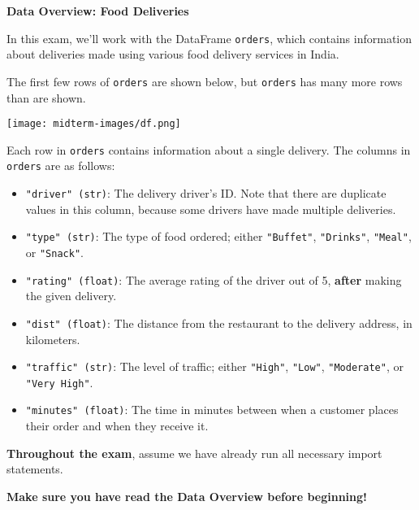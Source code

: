 \begin{center}
    \noindent \textbf{\large{Data Overview: Food Deliveries}} 
\end{center}

\noindent In this exam, we'll work with the DataFrame \texttt{orders}, which contains information about deliveries made using various food delivery services in India.

\vspace{.1in}

\noindent The first few rows of \texttt{orders} are shown below, but \texttt{orders} has many more rows than are shown.


\begin{center}

\texttt{[image: midterm-images/df.png]}

\end{center}

\vspace{.1in}

\noindent Each row in \texttt{orders} contains information about a single delivery. The columns in \texttt{orders} are as follows:

\begin{itemize}

\item \texttt{"driver" (str)}: The delivery driver's ID. Note that there are duplicate values in this column, because some drivers have made multiple deliveries.
\item \texttt{"type" (str)}: The type of food ordered; either \texttt{"Buffet"}, \texttt{"Drinks"}, \texttt{"Meal"}, or \texttt{"Snack"}.
\item \texttt{"rating" (float)}: The average rating of the driver out of 5, \textbf{after} making the given delivery.
\item \texttt{"dist" (float)}: The distance from the restaurant to the delivery address, in kilometers.
\item \texttt{"traffic" (str)}: The level of traffic; either \texttt{"High"}, \texttt{"Low"}, \texttt{"Moderate"}, or \texttt{"Very High"}.
\item \texttt{"minutes" (float)}: The time in minutes between when a customer places their order and when they receive it.

\end{itemize}

\noindent \textbf{Throughout the exam}, assume we have already run all necessary import statements.

\newpage

\noindent \textbf{Make sure you have read the Data Overview before beginning!}
